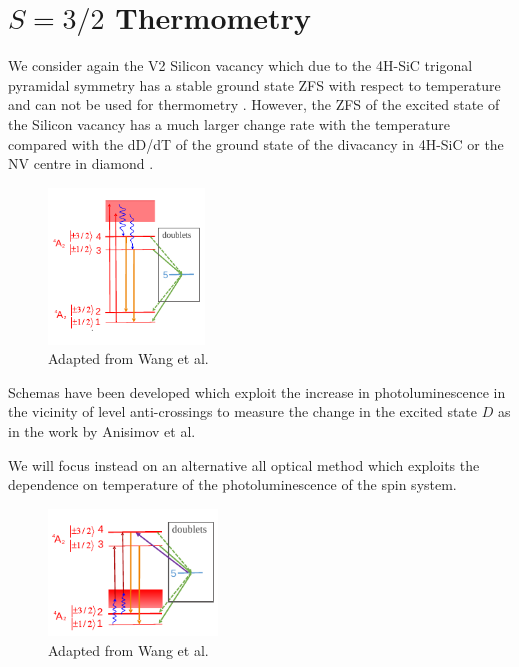 \section{$S= 3/2$ Thermometry}\label{spin1.5-thermo}
We consider again the V2 Silicon vacancy which due to the 4H-SiC trigonal
pyramidal symmetry has a stable ground state ZFS with respect to temperature and can not be used for thermometry \cite{Castelletto_2024}.
However, the ZFS of the excited state of the Silicon vacancy has a much
larger change rate with the temperature compared with the
dD/dT of the ground state of the divacancy in 4H-SiC or the
NV centre in diamond \cite{Anisimov2016}.

\begin{figure}%
	\centering%
	\includegraphics[width=0.37\textwidth]{figures/actual-stokes.pdf}
	\caption{Adapted from Wang et al.}\label{fig:stokes}
\end{figure}%

Schemas have been developed which exploit the increase in photoluminescence in the vicinity of level anti-crossings to measure the change in the excited state $D$ as in the work by Anisimov et al.  

We will focus instead on an alternative all optical method which exploits the dependence on temperature of the photoluminescence of the spin system.

\begin{figure}%
	\centering%
	\includegraphics[width=0.4\textwidth]{figures/stokes.pdf}
	\caption{Adapted from Wang et al.}\label{fig:anti-stokes}
\end{figure}%

